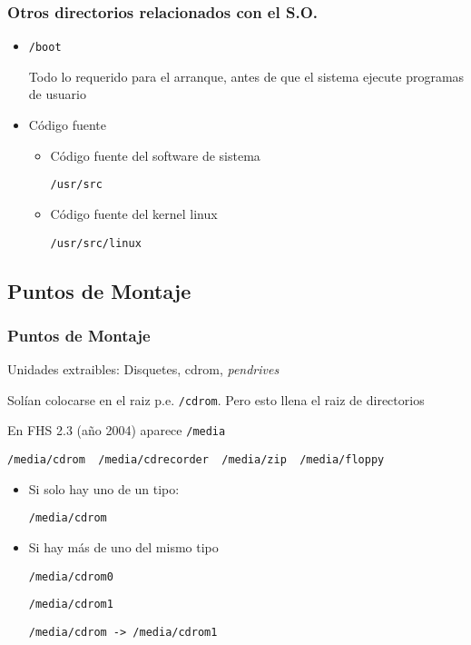 \documentclass[ucs]{beamer}
\begin{document}
\begin{frame}[fragile]

\frametitle{Otros directorios relacionados con el S.O.}
\begin{itemize}

\item 
\verb|/boot|

Todo lo requerido para el arranque, antes de que el sistema ejecute
programas de usuario


\item
Código fuente
        \begin{itemize}
\item 
Código fuente del software de sistema

\verb|/usr/src|

\item 
Código fuente del kernel linux

\verb|/usr/src/linux|
        \end{itemize}

\end{itemize}

\end{frame}




\subsection{Puntos de Montaje}
\begin{frame}[fragile]
\frametitle{Puntos de Montaje}

Unidades extraibles: Disquetes, cdrom, \emph{pendrives}

Solían colocarse en el raiz
p.e. \verb|/cdrom|. Pero esto llena el raiz de directorios

En FHS 2.3 (año 2004) aparece 
\verb|/media|

\verb|/media/cdrom  /media/cdrecorder  /media/zip  /media/floppy|


\begin{itemize}
\item 
Si solo hay uno de un tipo:

\verb|/media/cdrom|

\item 
Si hay más de uno del mismo tipo

\verb|/media/cdrom0|

\verb|/media/cdrom1|

\verb|/media/cdrom -> /media/cdrom1|

\end{itemize}


\end{frame}
\end{document}

